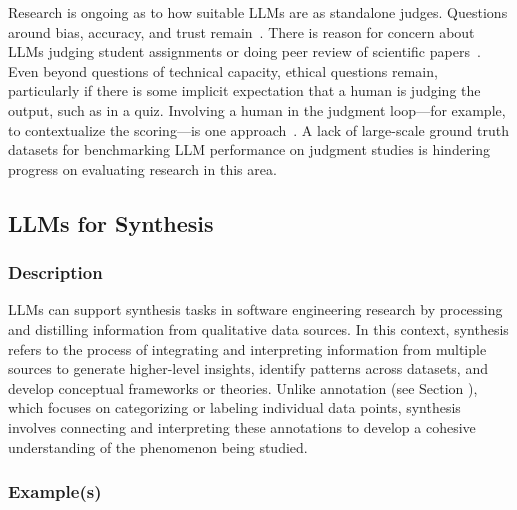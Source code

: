 Research is ongoing as to how suitable LLMs are as standalone judges. Questions around bias, accuracy, and trust remain~\cite{DBLP:journals/corr/abs-2406-18403}. There is reason for concern about LLMs judging student assignments or doing peer review of scientific papers~\cite{DBLP:conf/coling/ZhouC024}. Even beyond questions of technical capacity, ethical questions remain, particularly if there is some implicit expectation that a human is judging the output, such as in a quiz. Involving a human in the judgment loop---for example, to contextualize the scoring---is one approach~\cite{panHumanCenteredDesignRecommendations2024}. 
A lack of large-scale ground truth datasets for benchmarking LLM performance on judgment studies is hindering progress on evaluating research in this area.


\subsection{LLMs for Synthesis}

\subsubsection{Description}

LLMs can support synthesis tasks in software engineering research by processing and distilling information from qualitative data sources.
In this context, synthesis refers to the process of integrating and interpreting information from multiple sources to generate higher-level insights, identify patterns across datasets, and develop conceptual frameworks or theories. Unlike annotation (see Section \annotators), which focuses on categorizing or labeling individual data points, synthesis involves connecting and interpreting these annotations to develop a cohesive understanding of the phenomenon being studied.

\subsubsection{Example(s)} 

